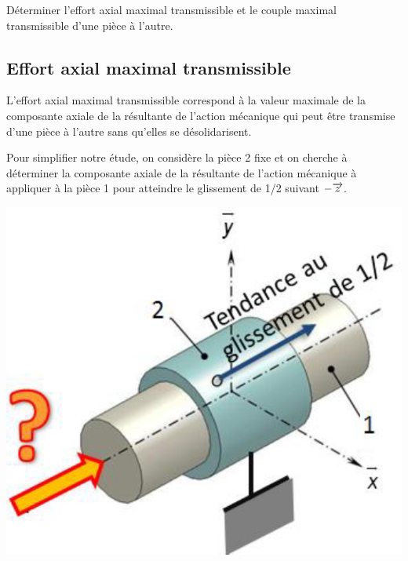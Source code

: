 \documentclass[10pt]{article}
\begin{document}
\begin{obj}
Déterminer l’effort axial maximal transmissible et le couple maximal transmissible d’une pièce à 
l’autre.
\end{obj}

\subsection*{Effort axial maximal transmissible}

\begin{minipage}[c]{.55\linewidth}
L’effort axial maximal transmissible correspond à la valeur maximale de la 
composante axiale de la résultante de l’action mécanique qui peut être transmise 
d’une pièce à l’autre sans qu’elles se désolidarisent. 
 
Pour simplifier notre étude, on considère la pièce 2 fixe et on cherche à déterminer 
la composante axiale de la résultante de l’action mécanique à appliquer à la pièce 1 
pour atteindre le glissement de 1/2 suivant $-\overrightarrow{z}$. 


\end{minipage}\hfill
\begin{minipage}[c]{.4\linewidth}
\begin{center}
\includegraphics[width=.9\textwidth]{images/fig_02}
\end{center}
\end{minipage}

\vspace{.25cm}
\end{document}
